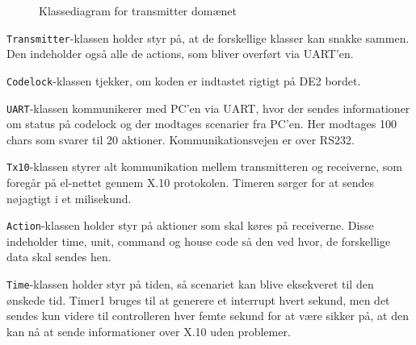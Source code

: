 \begin{figure}[h]
	\centering {}
	\caption{Klassediagram for transmitter domænet}
\end{figure}

\texttt{Transmitter}-klassen holder styr på, at de forskellige klasser kan snakke sammen. Den indeholder også alle de actions, som bliver overført via UART'en.

\texttt{Codelock}-klassen tjekker, om koden er indtastet rigtigt på DE2 bordet.

\texttt{UART}-klassen kommunikerer med PC'en via UART, hvor der sendes informationer om status på codelock og der modtages scenarier fra PC'en. Her modtages 100 chars som svarer til 20 aktioner. Kommunikationsvejen er over RS232.

\texttt{Tx10}-klassen styrer alt kommunikation mellem transmitteren og receiverne, som foregår på el-nettet gennem X.10 protokolen. Timeren sørger for at sendes nøjagtigt i et milisekund.

\texttt{Action}-klassen holder styr på aktioner som skal køres på receiverne. Disse indeholder time, unit, command og house code så den ved hvor, de forskellige data skal sendes hen.

\texttt{Time}-klassen holder styr på tiden, så scenariet kan blive eksekveret til den ønskede tid. Timer1 bruges til at generere et interrupt hvert sekund, men det sendes kun videre til controlleren hver femte sekund for at være sikker på, at den kan nå at sende informationer over X.10 uden problemer. 


